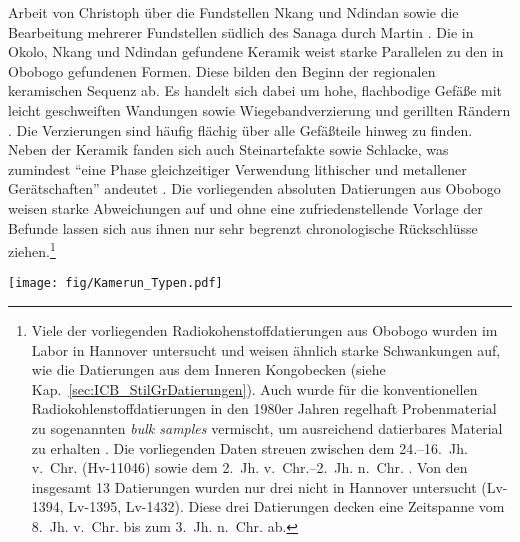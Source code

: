 Arbeit von Christoph \textcite{MbidaMindzie.19951996} über die Fundstellen Nkang und \mbox{Ndindan} sowie die Bearbeitung mehrerer Fundstellen südlich des Sanaga durch Martin \textcite{Elouga.20002001}. Die in Okolo, Nkang und Ndindan gefundene Keramik weist starke Parallelen zu den in Obobogo gefundenen Formen. Diese bilden den Beginn der regionalen keramischen Sequenz ab. Es handelt sich dabei um hohe, flachbodige Gefäße mit leicht geschweiften Wandungen sowie Wiegebandverzierung und gerillten Rändern \parencite[Abb.~\ref{fig:swCameroon_Sequence}.1--4;][]{Claes.1985}. Die Verzierungen sind häufig flächig über alle Gefäßteile hinweg zu finden. Neben der Keramik fanden sich auch Steinartefakte sowie Schlacke, was zumindest \enquote{eine Phase gleichzeitiger Verwendung lithischer und metallener Gerätschaften} andeutet \parencite[258\,f.]{Wotzka.1995}. Die vorliegenden absoluten Datierungen aus Obobogo weisen starke Abweichungen auf und ohne eine zufriedenstellende Vorlage der Befunde lassen sich aus ihnen nur sehr begrenzt chronologische Rückschlüsse ziehen.\footnote{Viele der vorliegenden Radiokohenstoffdatierungen aus Obobogo wurden im Labor in Hannover untersucht und weisen ähnlich starke Schwankungen auf, wie die Datierungen aus dem Inneren Kongobecken (siehe Kap.~\ref{sec:ICB_StilGrDatierungen}). Auch wurde für die konventionellen Radiokohlenstoffdatierungen in den 1980er Jahren regelhaft Probenmaterial zu sogenannten \textit{bulk samples} vermischt, um ausreichend datierbares Material zu erhalten \parencite[723]{Clist.20042005}. Die vorliegenden Daten streuen zwischen dem 24.--16.~Jh. v.~Chr. (Hv-11046) sowie dem 2.~Jh. v.~Chr.--2.~Jh. n.~Chr. \parencites[Hv-10832;][147]{deMaret.1985b}[219\,f.]{Clist.1986}[nach][249 Anm. 21]{Wotzka.1995}. Von den insgesamt 13 Datierungen wurden nur drei nicht in Hannover untersucht (Lv-1394, Lv-1395, Lv-1432). Diese drei Datierungen decken eine Zeitspanne vom 8.~Jh. v.~Chr. bis zum 3.~Jh. n.~Chr. ab.}

\begin{figure*}[p]
	\centering
	\texttt{[image: fig/Kamerun\_Typen.pdf]}
	\caption{Südliches Kamerun: Regionale Sequenz der frühen Eisenzeit nach \textcites{GouemGouem.20102011}{NlendNlend.20132014}.\\ 1--4: Obobogo-Gruppe \parencites[Taf. 25.1--2, 37.1, 39.2]{Claes.1985}[632 Abb.~43.4]{deMaret.2013}; 5--7: Bissiang/Malongo-Gruppe \parencites[34 Abb.~14]{Oslisly.2001c}[282 Abb.~3.2, 287 Abb.~7.3]{Eggert.2006b}; 8--9: Mpoengu/Bwambé-Gruppe \parencites[282 Abb.~3.7]{Eggert.2006b}[252 Abb.~114.2]{NlendNlend.20132014}, 10--13: Akonètye (Nord) \parencite[195 Abb.~10.2--5]{Meister.2008b}; Akonètye (Süd) (ebd. 188 Abb.~5.2); 13--14: Campo-Gruppe \parencite[98 Abb.~5.6, 182 Taf.~12.2, 184 Taf.~14.4]{Eggert.2016}.}
	\label{fig:swCameroon_Sequence}
\end{figure*}

